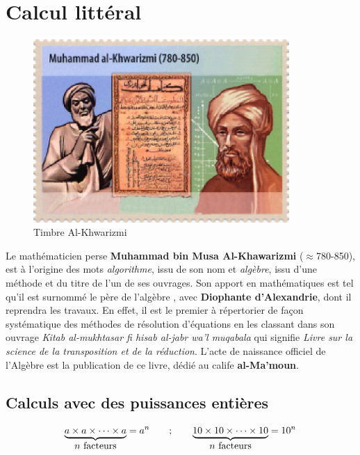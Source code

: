 \chapter{Calcul littéral} \label{N3}

\vfill

\begin{figure}[h]
   \centering
      \includegraphics[height=7cm]{Nombres_et_calculs/Images/N3_intro_Alkhwarizmi}
   \caption{Timbre Al-Khwarizmi}
\end{figure}

\vfill

\begin{prerequis}
   Le mathématicien perse {\bf Muhammad bin Musa Al-Khawarizmi} ($\approx$780-850), est à l'origine des mots \textit{algorithme}, issu de son nom et \textit{algèbre}, issu d'une méthode et du titre de l'un de ses ouvrages. Son apport en mathématiques est tel qu'il est surnommé \og le père de l'algèbre \fg, avec {\bf Diophante d'Alexandrie}, dont il reprendra les travaux. En effet, il est le premier à répertorier de façon systématique des méthodes de résolution d'équations en les classant dans son ouvrage {\it Kitab al-mukhtasar fi hisab al-jabr wa'l muqabala} qui signifie {\it Livre sur la science de la transposition et de la réduction}. L'acte de naissance officiel de l'Algèbre est la publication de ce livre, dédié au calife {\bf al-Ma'moun}. 
\end{prerequis}


\cours %

\section{Calculs avec des puissances entières} %

\begin{definition}[Notation]
   $$\underbrace{a\times a\times\cdots\times a}_{\hbox{$n$ facteurs}} =a^n \qquad ; \qquad \underbrace{10\times10\times\cdots\times10}_{\hbox{$n$ facteurs}} =10^n$$
\end{definition}

